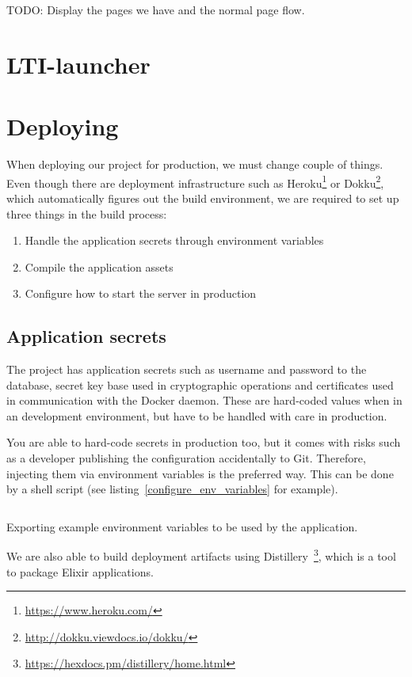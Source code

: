 TODO: Display the pages we have and the normal page flow.

\section{LTI-launcher}

\section{Deploying}

When deploying our project for production, we must change couple of things. Even though there are deployment infrastructure such as Heroku\footnote{\url{https://www.heroku.com/}} or Dokku\footnote{\url{http://dokku.viewdocs.io/dokku/}}, which automatically figures out the build environment, we are required to set up three things in the build process:

\begin{enumerate}
    \item Handle the application secrets through environment variables
    \item Compile the application assets
    \item Configure how to start the server in production
\end{enumerate}

\subsection{Application secrets}

The project has application secrets such as username and password to the database, secret key base used in cryptographic operations and certificates used in communication with the Docker daemon. These are hard-coded values when in an development environment, but have to be handled with care in production.

You are able to hard-code secrets in production too, but it comes with risks such as a developer publishing the configuration accidentally to Git. Therefore, injecting them via environment variables is the preferred way. This can be done by a shell script (see listing~\ref{configure_env_variables} for example).

\begin{listing}
    \inputminted{bash}{code/env.sh}
    \caption{Exporting example environment variables to be used by the application.}
    \label{configure_env_variables}
\end{listing}

We are also able to build deployment artifacts using Distillery~\footnote{\url{https://hexdocs.pm/distillery/home.html}}, which is a tool to package Elixir applications.

